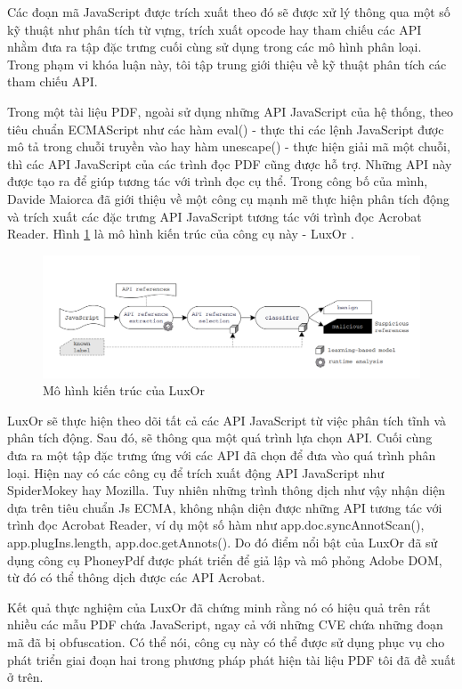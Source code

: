 \documentclass[./../main.tex]{subfiles}
\begin{document}
Các đoạn mã JavaScript được trích xuất theo đó sẽ được xử lý thông qua một số kỹ thuật như phân tích từ vựng, trích xuất opcode hay tham chiếu các API nhằm đưa ra tập đặc trưng cuối cùng sử dụng trong các mô hình phân loại. Trong phạm vi khóa luận này, tôi tập trung giới thiệu về kỹ thuật phân tích các tham chiếu API.

Trong một tài liệu PDF, ngoài sử dụng những API JavaScript của hệ thống, theo tiêu chuẩn ECMAScript như các hàm eval() - thực thi các lệnh JavaScript được mô tả trong chuỗi truyền vào hay hàm unescape() - thực hiện giải mã một chuỗi, thì các API JavaScript của các trình đọc PDF cũng được hỗ trợ. Những API này được tạo ra để giúp tương tác với trình đọc cụ thể. Trong công bố của mình, Davide Maiorca đã giới thiệu về một công cụ mạnh mẽ thực hiện phân tích động và trích xuất các đặc trưng API JavaScript tương tác với trình đọc Acrobat Reader. Hình \ref{fig:luxor} là mô hình kiến trúc của công cụ này - LuxOr \cite{luxor}.

\begin{figure}[H]
	\centering
	\includegraphics[width=\linewidth]{./images/luxOr.png}
	\caption{Mô hình kiến trúc của LuxOr \cite{luxor}}
	\label{fig:luxor}
\end{figure}

LuxOr sẽ thực hiện theo dõi tất cả các API JavaScript từ việc phân tích tĩnh và phân tích động. Sau đó, sẽ thông qua một quá trình lựa chọn API. Cuối cùng đưa ra một tập đặc trưng ứng với các API đã chọn để đưa vào quá trình phân loại. Hiện nay có các công cụ để trích xuất động API JavaScript như SpiderMokey hay Mozilla. Tuy nhiên những trình thông dịch như vậy nhận diện dựa trên tiêu chuẩn Js ECMA, không nhận diện được những API tương tác với trình đọc Acrobat Reader, ví dụ một số hàm như app.doc.syncAnnotScan(), app.plugIns.length, app.doc.getAnnots(). Do đó điểm nổi bật của LuxOr đã sử dụng công cụ PhoneyPdf được phát triển để giả lập và mô phỏng Adobe DOM, từ đó có thể thông dịch được các API Acrobat.

Kết quả thực nghiệm của LuxOr đã chứng minh rằng nó có hiệu quả trên rất nhiều các mẫu PDF chứa JavaScript, ngay cả với những CVE chứa những đoạn mã đã bị obfuscation. Có thể nói, công cụ này có thể được sử dụng phục vụ cho phát triển giai đoạn hai trong phương pháp phát hiện tài liệu PDF tôi đã đề xuất ở trên.
\end{document}
